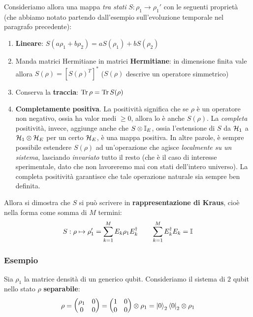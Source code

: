 \documentclass[../../InformazioneQuantistica.tex]{subfiles}
\begin{document}
Consideriamo allora una mappa  \textit{tra stati} $S: \rho_1 \to \rho_1'$  con le seguenti proprietà (che abbiamo notato partendo dall'esempio sull'evoluzione temporale nel paragrafo precedente):
\begin{enumerate}
\item \textbf{Lineare}: $S(a\rho_1 + b\rho_2) = aS(\rho_1) + bS(\rho_2)$
\item Manda matrici Hermitiane in matrici \textbf{Hermitiane}: in dimensione finita vale allora $S(\rho)=[S(\rho)^T]^*$ ($S(\rho)$ descrive un operatore simmetrico)
\item Conserva la \textbf{traccia}: $\operatorname{Tr}\rho = \operatorname{Tr}S(\rho)$
\item \textbf{Completamente} \textbf{positiva}. La positività significa che se $\rho$ è un operatore non negativo, ossia ha valor medi $\geq 0$, allora lo è anche $S(\rho)$. La \textit{completa} positività, invece, aggiunge anche che $S\otimes \mathbb{I}_E$, ossia l'estensione di $S$ da $\mathcal{H}_1$ a $\mathcal{H}_1 \otimes \mathcal{H}_E$ per un certo $\mathcal{H}_E$, è una mappa positiva. In altre parole, è sempre possibile estendere $S(\rho)$ ad un'operazione che agisce \textit{localmente su un sistema}, lasciando \textit{invariato} tutto il resto (che è il caso di interesse sperimentale, dato che non lavoreremo mai con stati dell'intero universo). La completa positività garantisce che tale operazione naturale sia sempre ben definita.

\end{enumerate}
Allora si dimostra che $S$ si può scrivere in \textbf{rappresentazione di Kraus}, cioè nella forma  come somma di $M$ termini:
\begin{align*}
S: \rho \mapsto \rho_1' = \sum_{k=1}^{M} E_k \rho_1 E_k^\dag \qquad \sum_{k=1}^M E_k^\dag E_k = \mathbb{I}
\end{align*}


\subsubsection{Esempio}
Sia $\rho_1$ la matrice densità di un generico qubit. Consideriamo il sistema di $2$ qubit nello stato $\rho$ \textbf{separabile}:
\begin{align*}
\rho = \begin{pmatrix} \rho_1 & 0 \\ 0 & 0\end{pmatrix} = \begin{pmatrix}1 & 0\\ 0 & 0 \end{pmatrix} \otimes \rho_1 = \Ket{0}_2\Bra{0}_2 \otimes \rho_1
\end{align*}
\end{document}
